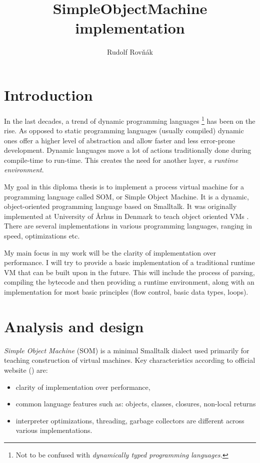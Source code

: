 \documentclass[thesis=M,english]{FITthesis}[2019/12/23]
\title{SimpleObjectMachine implementation}
\author{Rudolf Rovňák} %
\begin{document}

\setcounter{secnumdepth}{3}
\chapter{Introduction}
In the last decades, a trend of dynamic programming languages \footnote{Not to be confused with \textit{dynamically typed programming languages.}} has been on the rise.
As opposed to static programming languages (usually compiled) dynamic ones offer a higher level of abstraction and allow faster and less error-prone development.
Dynamic languages move a lot of actions traditionally done during compile-time to run-time. This creates the need for another layer, \textit{a runtime environment}.

My goal in this diploma thesis is to implement a process virtual machine for a programming language called SOM, or Simple Object Machine. 
It is a dynamic, object-oriented programming language based on Smalltalk. It was originally implemented at University of Århus in Denmark to teach
object oriented VMs \cite{som-github}. There are several implementations in various programming languages, ranging in speed, optimizations etc.

My main focus in my work will be the clarity of implementation over performance. I will try to provide a basic implementation of a traditional runtime
VM that can be built upon in the future. This will include the process of parsing, compiling the bytecode and then providing a runtime environment,
along with an implementation for most basic principles (flow control, basic data types, loops).

\chapter{Analysis and design}
\textit{Simple Object Machine} (SOM) is a minimal Smalltalk dialect used primarily for teaching construction of virtual machines. Key characteristics
according to official website (\cite{som-github}) are:
\begin{itemize}
	\item clarity of implementation over performance,
	\item common language features such as: objects, classes, closures, non-local returns
	\item interpreter optimizations, threading, garbage collectors are different
		across various implementations.
\end{itemize}
\end{document}
